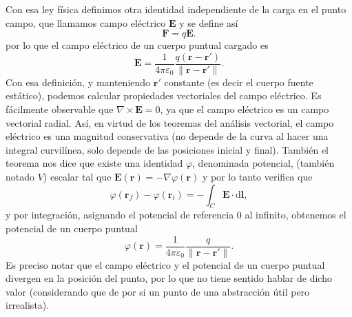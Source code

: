 \documentclass[11pt,a4paper]{article}
\numberwithin{equation}{section}
\begin{document}
Con esa ley física definimos otra identidad independiente de la carga en el punto campo, que llamamos campo eléctrico $\textbf{E}$ y se define así
\begin{equation}
    \textbf{F} = q \textbf{E}.
    \label{eq:e_campo}
\end{equation}
por lo que el campo eléctrico de un cuerpo puntual cargado es
\begin{equation}
    \textbf{E} = \frac{1}{4\pi\varepsilon_0} \frac{q (\textbf{r} - \textbf{r}')}{\| \textbf{r} - \textbf{r}' \|}.
    \label{eq:e_campo_punto}
\end{equation}
Con esa definición, y manteniendo $\textbf{r}'$ constante (es decir el cuerpo fuente estático), podemos calcular propiedades vectoriales del campo eléctrico. Es fácilmente observable que $\nabla \times \textbf{E} = 0$, ya que el campo eléctrico es un campo vectorial radial. Así, en virtud de los teoremas del análisis vectorial, el campo eléctrico es una magnitud conservativa (no depende de la curva al hacer una integral curvilínea, solo depende de las posiciones inicial y final). También el teorema nos dice que existe una identidad $\varphi$, denominada potencial, (también notado $V$) escalar tal que $\textbf{E}(\textbf{r}) = - \nabla \varphi(\textbf{r})$ y por lo tanto verifica que
\begin{equation}
    \varphi(\textbf{r}_f) - \varphi(\textbf{r}_i)  = - \int_C \textbf{E} \cdot
    \mathrm{d}\textbf{l},
    \label{eq:e_potencial}
\end{equation}
y por integración, asignando el potencial de referencia 0 al infinito, obtenemos el potencial de un cuerpo puntual
\begin{equation}
    \varphi(\textbf{r}) =  \frac{1}{4\pi\varepsilon_0} \frac{q}{\| \textbf{r} - \textbf{r}' \|}.
    \label{eq:e_potencial_punto}
\end{equation}
Es preciso notar que el campo eléctrico y el potencial de un cuerpo puntual divergen en la posición del punto, por lo que no tiene sentido hablar de dicho valor (considerando que de por si un punto de una abstracción útil pero irrealista). 
\end{document}
